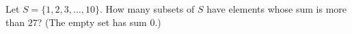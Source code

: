 Let $S=\{1,2,3,\dots,10\}$. How many subsets of $S$ have elements whose sum is more than $27$? (The empty set has sum $0$.)
